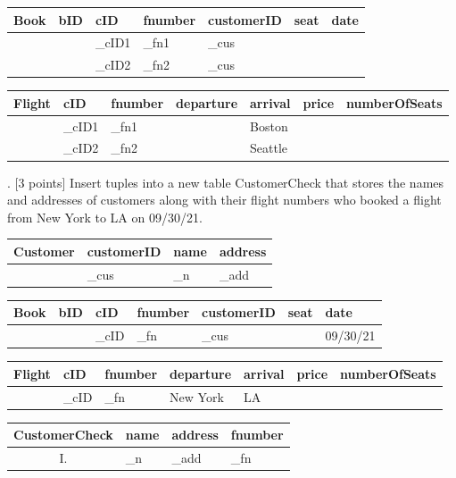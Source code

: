 \documentclass[]{article}
\begin{document}
	\begin{table}[H]
		\begin{tabular}{|l|l|l|l|l|l|l|}
			\hline
			Book & bID & cID & fnumber & customerID & seat & date \\ \hline
				 & 	   & \_cID1	 &  \_fn1 &	\_cus	&  		&  		\\ \hline
			 	 & 	   & \_cID2	 &  \_fn2 &	\_cus	&  		&  		\\ \hline
		\end{tabular}
	\end{table}
	
	\begin{table}[H]
		\begin{tabular}{|l|l|l|l|l|l|l|}
			\hline
			Flight & cID & fnumber & departure & arrival & price & numberOfSeats \\ \hline
				   & \_cID1	 &  \_fn1 & 		 &  Boston	& 	 &  				\\ \hline
			   	   & \_cID2	 &  \_fn2 & 		 &  Seattle	& 	 &  				\\ \hline
		\end{tabular}
	\end{table}
	
	. [3 points] Insert tuples into a new table CustomerCheck that stores the names and addresses of customers along with their flight numbers who booked a flight from New York to LA on 09/30/21.  \\
	
	\begin{table}[H]
		\begin{tabular}{|l|l|l|l|}
			\hline
			Customer & customerID & name & address \\ \hline
					 &  \_cus	  & \_n  & \_add   \\ \hline
		\end{tabular}
	\end{table}
	
	\begin{table}[H]
		\begin{tabular}{|l|l|l|l|l|l|l|}
			\hline
			Book & bID & cID & fnumber & customerID & seat & date \\ \hline
				 & 	   & \_cID & \_fn  &  \_cus     &	  & 09/30/21	 \\ \hline
		\end{tabular}
	\end{table}
	
	\begin{table}[H]
		\begin{tabular}{|l|l|l|l|l|l|l|}
			\hline
			Flight & cID & fnumber & departure & arrival & price & numberOfSeats \\ \hline
				   & \_cID & \_fn  &  New York &  LA  	 & 		 & 				 \\ \hline
		\end{tabular}
	\end{table}

	\begin{table}[H]
		\begin{tabular}{|c|l|l|l|}
			\hline
			CustomerCheck & name & address & fnumber \\ \hline
				I.		  &  \_n  & \_add  & \_fn   \\ \hline
		\end{tabular}
	\end{table}
	
\end{document}
